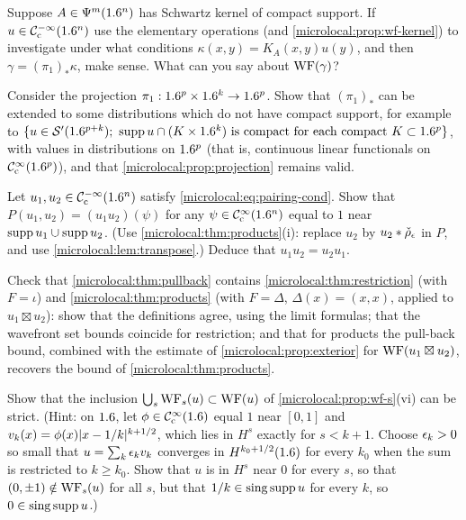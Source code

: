 \begin{exercise}\label{microlocal:ex:kernel-action}
  Suppose $A\in\Psi^{m}(1.6^n)$ has Schwartz kernel of compact support. If
  $u\in\mathcal{C}^{-\infty}_{\mathrm{c}}(1.6^n)$ use the elementary operations (and
  \cref{microlocal:prop:wf-kernel}) to investigate under what conditions
  $\kappa(x,y)=K_A(x,y)u(y)$, and then $\gamma=(\pi_1)_*\kappa$, make sense.
  What can you say about $\operatorname{WF}(\gamma)$?
\end{exercise}

\begin{exercise}\label{microlocal:ex:projection-noncompact}
  Consider the projection $\pi_1:1.6^p\times1.6^k\to1.6^p$. Show that $(\pi_1)_*$
  can be extended to some distributions which do not have compact support,
  for example to
  $\{u\in\mathcal{S}'(1.6^{p+k});\ \operatorname{supp} u\cap(K\times1.6^k)\text{ is compact for each compact }K\subset1.6^p\}$,
  with values in distributions on $1.6^p$ (that is, continuous linear functionals
  on $\mathcal{C}^\infty_{\mathrm{c}}(1.6^p)$), and that \cref{microlocal:prop:projection} remains valid.
\end{exercise}

\begin{exercise}\label{microlocal:ex:pairing-product}
  Let $u_1,u_2\in\mathcal{C}^{-\infty}_{\mathrm{c}}(1.6^n)$ satisfy \eqref{microlocal:eq:pairing-cond}.
  Show that $P(u_1,u_2)=(u_1u_2)(\psi)$ for any $\psi\in\mathcal{C}^\infty_{\mathrm{c}}(1.6^n)$ equal to $1$
  near $\operatorname{supp} u_1\cup\operatorname{supp} u_2$. (Use \cref{microlocal:thm:products}(i):
  replace $u_2$ by $u_2*\check\rho_\epsilon$ in $P$, and use
  \cref{microlocal:lem:transpose}.) Deduce that $u_1u_2=u_2u_1$.
\end{exercise}

\begin{exercise}\label{microlocal:ex:pullback-special}
  Check that \cref{microlocal:thm:pullback} contains
  \cref{microlocal:thm:restriction} (with $F=\iota$) and
  \cref{microlocal:thm:products} (with $F=\Delta$, $\Delta(x)=(x,x)$, applied to
  $u_1\boxtimes u_2$): show that the definitions agree, using the limit
  formulas; that the wavefront set bounds coincide for restriction; and that
  for products the pull-back bound, combined with the estimate of
  \cref{microlocal:prop:exterior} for $\operatorname{WF}(u_1\boxtimes u_2)$, recovers the
  bound of \cref{microlocal:thm:products}.
\end{exercise}

\begin{exercise}\label{microlocal:ex:wf-s-union}
  Show that the inclusion $\bigcup_s\operatorname{WF}_s(u)\subset\operatorname{WF}(u)$ of
  \cref{microlocal:prop:wf-s}(vi) can be strict. (Hint: on $1.6$, let
  $\phi\in\mathcal{C}^\infty_{\mathrm{c}}(1.6)$ equal $1$ near $[0,1]$ and $v_k(x)=\phi(x)\lvert x-1/k\rvert^{k+1/2}$,
  which lies in $H^s$ exactly for $s<k+1$. Choose $\epsilon_k>0$ so small that
  $u=\sum_k\epsilon_kv_k$ converges in $H^{k_0+1/2}(1.6)$ for every $k_0$ when the sum
  is restricted to $k\ge k_0$. Show that $u$ is in $H^s$ near $0$ for every $s$,
  so that $(0,\pm1)\notin\operatorname{WF}_s(u)$ for all $s$, but that $1/k\in\operatorname{sing\,supp} u$ for
  every $k$, so $0\in\operatorname{sing\,supp} u$.)
\end{exercise}

